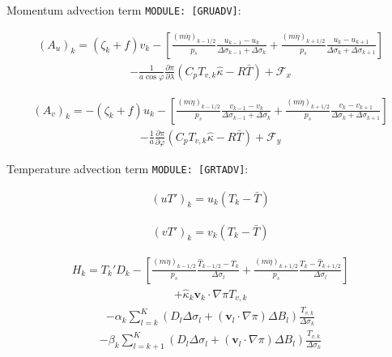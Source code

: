 Momentum advection term \texttt{MODULE:\ {[}GRUADV{]}}:

\begin{eqnarray}
  (A_u)_k
    =  ( \zeta_k + f ) v_k 
             - \left[ \frac{(m\dot{\eta})_{k-1/2}}{p_s} \frac{u_{k-1} - u_k}{\Delta\sigma_{k-1}+\Delta\sigma_k}
               + \frac{(m\dot{\eta})_{k+1/2}}{p_s} \frac{u_k   - u_{k+1}}{\Delta\sigma_{k}+\Delta\sigma_{k+1}} \right]
\end{eqnarray} \begin{eqnarray}
           - \frac{1}{a\cos\varphi} \frac{\partial \pi}{\partial \lambda}(C_p T_{v,k}\hat{\kappa}-R\bar{T})
             + {\mathcal F}_x
\end{eqnarray}

\begin{eqnarray}
  (A_v)_k
    =  - ( \zeta_k + f ) u_k 
             - \left[ \frac{(m\dot{\eta})_{k-1/2}}{p_s} \frac{v_{k-1} - v_k}{\Delta\sigma_{k-1}+\Delta\sigma_k}
               + \frac{(m\dot{\eta})_{k+1/2}}{p_s} \frac{v_k   - v_{k+1}}{\Delta\sigma_{k}+\Delta\sigma_{k+1}} \right]
\end{eqnarray} \begin{eqnarray}
           - \frac{1}{a} \frac{\partial \pi}{\partial \varphi}(C_p T_{v,k}\hat{\kappa}-R\bar{T})
             + {\mathcal F}_y
\end{eqnarray}

Temperature advection term \texttt{MODULE:\ {[}GRTADV{]}}:

\begin{eqnarray}
 (u T')_k  = u_k (T_k - \bar{T} )
\end{eqnarray}

\begin{eqnarray}
 (v T')_k  = v_k (T_k - \bar{T} )
\end{eqnarray}

\begin{eqnarray}
   H_k =  T_k' D_k 
          - \left[ \frac{(m\dot{\eta})_{k-1/2}}{p_s} \frac{\hat{T}_{k-1/2} - T_k}{\Delta \sigma_l}
               + \frac{(m\dot{\eta})_{k+1/2}}{p_s} \frac{T_k - \hat{T}_{k+1/2}}{\Delta \sigma_l} \right]
\end{eqnarray} \begin{eqnarray}
        + \hat{\kappa}_k {\mathbf{v}}_k \cdot \nabla \pi T_{v,k} 
\end{eqnarray} \begin{eqnarray}
        - \alpha_k \sum_{l=k}^{K} 
                           (D_l \Delta \sigma_l + ({\mathbf{v}}_l \cdot \nabla \pi)\Delta B_l)
                            \frac{T_{v,k}}{\Delta \sigma_k} 
\end{eqnarray} \begin{eqnarray}
        - \beta_k \sum_{l=k+1}^{K} 
                           (D_l \Delta \sigma_l + ({\mathbf{v}}_l \cdot \nabla \pi)\Delta B_l)
                            \frac{T_{v,k}}{\Delta \sigma_k}
\end{eqnarray}

